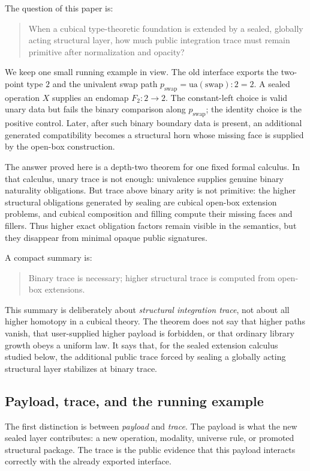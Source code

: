 \documentclass{lmcs}
\begin{document}
The question of this paper is:
\begin{quote}
When a cubical type-theoretic foundation is extended by a sealed, globally acting
structural layer, how much public integration trace must remain primitive after
normalization and opacity?
\end{quote}

We keep one small running example in view.  The old interface exports the
two-point type \(2\) and the univalent swap path
\(p_{\mathrm{swap}}=\mathrm{ua}(\mathrm{swap}):2=2\).  A sealed operation
\(X\) supplies an endomap \(F_2:2\to2\).  The constant-left choice is valid
unary data but fails the binary comparison along \(p_{\mathrm{swap}}\); the
identity choice is the positive control.  Later, after such binary boundary data
is present, an additional generated compatibility becomes a structural horn
whose missing face is supplied by the open-box construction.

The answer proved here is a depth-two theorem for one fixed formal calculus.  In
that calculus, unary trace is not enough: univalence supplies genuine binary
naturality obligations.  But trace above binary arity is not primitive: the
higher structural obligations generated by sealing are cubical open-box extension
problems, and cubical composition and filling compute their missing faces and
fillers.  Thus higher exact obligation factors remain visible in the semantics,
but they disappear from minimal opaque public signatures.

A compact summary is:
\begin{quote}
Binary trace is necessary; higher structural trace is computed from
open-box extensions.
\end{quote}

This summary is deliberately about \emph{structural integration trace}, not about
all higher homotopy in a cubical theory.  The theorem does not say that higher
paths vanish, that user-supplied higher payload is forbidden, or that ordinary
library growth obeys a uniform law.  It says that, for the sealed
extension calculus studied below, the additional public trace forced by sealing a
globally acting structural layer stabilizes at binary trace.

\subsection{Payload, trace, and the running example}

The first distinction is between \emph{payload} and \emph{trace}.  The payload is
what the new sealed layer contributes: a new operation, modality, universe rule,
or promoted structural package.  The trace is the public evidence that this
payload interacts correctly with the already exported interface.
\end{document}
